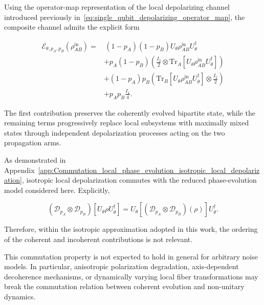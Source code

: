 \medskip

Using the operator-map representation of the local depolarizing channel introduced previously in~\eqref{eq:single_qubit_depolarizing_operator_map}, the composite channel admits the explicit form

\begin{equation}
\begin{aligned}
\mathcal{E}_{\theta,p_A,p_B}
\left(
\rho_{AB}^{\mathrm{in}}
\right)
=
&\,
(1-p_A)(1-p_B)
U_{\theta}
\rho_{AB}^{\mathrm{in}}
U_{\theta}^{\dagger}
\\
&+
p_A(1-p_B)
\left(
\frac{I_2}{2}
\otimes
\mathrm{Tr}_A
\left[
U_{\theta}
\rho_{AB}^{\mathrm{in}}
U_{\theta}^{\dagger}
\right]
\right)
\\
&+
(1-p_A)p_B
\left(
\mathrm{Tr}_B
\left[
U_{\theta}
\rho_{AB}^{\mathrm{in}}
U_{\theta}^{\dagger}
\right]
\otimes
\frac{I_2}{2}
\right)
\\
&+
p_Ap_B
\frac{I_4}{4}.
\end{aligned}
\label{eq:explicit_composite_channel_map}
\end{equation}

\medskip

The first contribution preserves the coherently evolved bipartite state, while the remaining terms progressively replace local subsystems with maximally mixed states through independent depolarization processes acting on the two propagation arms.

\medskip

As demonstrated in Appendix~\ref{app:Commutation_local_phase_evolution_isotropic_local_depolarization}, isotropic local depolarization commutes with the reduced phase-evolution model considered here. Explicitly,

\begin{equation}
\left(
\mathcal{D}_{p_A}
\otimes
\mathcal{D}_{p_B}
\right)
\left[
U_{\theta}
\rho
U_{\theta}^{\dagger}
\right]
=
U_{\theta}
\left[
\left(
\mathcal{D}_{p_A}
\otimes
\mathcal{D}_{p_B}
\right)
(\rho)
\right]
U_{\theta}^{\dagger}.
\label{eq:explicit_channel_commutation}
\end{equation}

Therefore, within the isotropic approximation adopted in this work, the ordering of the coherent and incoherent contributions is not relevant.

\medskip

This commutation property is not expected to hold in general for arbitrary noise models. In particular, anisotropic polarization degradation, axis-dependent decoherence mechanisms, or dynamically varying local fiber transformations may break the commutation relation between coherent evolution and non-unitary dynamics.

